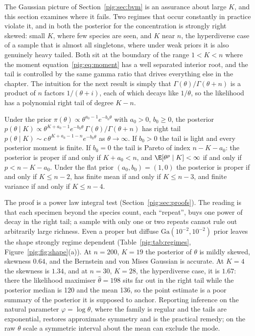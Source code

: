 The Gaussian picture of Section~\ref{pig:sec:bvm} is an assurance about large $K$, and this section examines where it fails. Two regimes that occur constantly in practice violate it, and in both the posterior for the concentration is strongly right skewed: small $K$, where few species are seen, and $K$ near $n$, the hyperdiverse case of a sample that is almost all singletons, where under weak priors it is also genuinely heavy tailed. Both sit at the boundary of the range $1<K<n$ where the moment equation~\eqref{pig:eq:moment} has a well separated interior root, and the tail is controlled by the same gamma ratio that drives everything else in the chapter. The intuition for the next result is simply that $\Gamma(\theta)/\Gamma(\theta+n)$ is a product of $n$ factors $1/(\theta+i)$, each of which decays like $1/\theta$, so the likelihood has a polynomial right tail of degree $K-n$.

\begin{proposition}\label{pig:prop:tail}
Under the prior $\pi(\theta)\propto\theta^{a_0-1}e^{-b_0\theta}$ with $a_0>0$, $b_0\ge0$, the posterior $p(\theta\mid K)\propto\theta^{K+a_0-1}e^{-b_0\theta}\,\Gamma(\theta)/\Gamma(\theta+n)$ has right tail $p(\theta\mid K)\sim c\,\theta^{K+a_0-1-n}e^{-b_0\theta}$ as $\theta\to\infty$. If $b_0>0$ the tail is light and every posterior moment is finite. If $b_0=0$ the tail is Pareto of index $n-K-a_0$: the posterior is proper if and only if $K+a_0<n$, and $\E[\theta^p\mid K]<\infty$ if and only if $p<n-K-a_0$. Under the flat prior $(a_0,b_0)=(1,0)$ the posterior is proper if and only if $K\le n-2$, has finite mean if and only if $K\le n-3$, and finite variance if and only if $K\le n-4$.
\end{proposition}

The proof is a power law integral test (Section~\ref{pig:sec:proofs}). The reading is that each specimen beyond the species count, each ``repeat'', buys one power of decay in the right tail; a sample with only one or two repeats cannot rule out arbitrarily large richness. Even a proper but diffuse $\mathrm{Ga}(10^{-2},10^{-2})$ prior leaves the shape strongly regime dependent (Table~\ref{pig:tab:regimes}, Figure~\ref{pig:fig:shape}(a)). At $n=200$, $K=19$ the posterior of $\theta$ is mildly skewed, skewness $0.64$, and the Bernstein and von Mises Gaussian is accurate. At $K=4$ the skewness is $1.34$, and at $n=30$, $K=28$, the hyperdiverse case, it is $1.67$: there the likelihood maximiser $\hat\theta=198$ sits far out in the right tail while the posterior median is 120 and the mean 136, so the point estimate is a poor summary of the posterior it is supposed to anchor. Reporting inference on the natural parameter $\varphi=\log\theta$, where the family is regular and the tails are exponential, restores approximate symmetry and is the practical remedy; on the raw $\theta$ scale a symmetric interval about the mean can exclude the mode.

